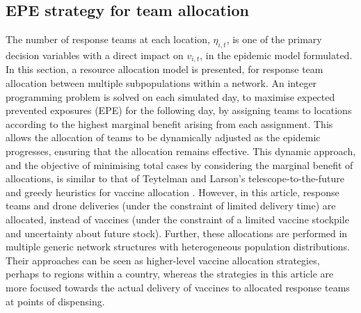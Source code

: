 \documentclass[10pt,letterpaper]{article}
\begin{document}
\subsection*{EPE strategy for team allocation}
The number of response teams at each location, $\eta_{i,t}$, is one of the primary decision variables with a direct impact on $v_{i,t}$, in the epidemic model formulated. In this section, a resource allocation model is presented, for response team allocation between multiple subpopulations within a network. An integer programming problem is solved on each simulated day, to maximise expected prevented exposures (EPE) for the following day, by assigning teams to locations according to the highest marginal benefit arising from each assignment. This allows the allocation of teams to be dynamically adjusted as the epidemic progresses, ensuring that the allocation remains effective. This dynamic approach, and the objective of minimising total cases by considering the marginal benefit of allocations, is similar to that of Teytelman and Larson's telescope-to-the-future and greedy heuristics for vaccine allocation \cite{teytelman2013multiregional}. However, in this article, response teams and drone deliveries (under the constraint of limited delivery time) are allocated, instead of vaccines (under the constraint of a limited vaccine stockpile and uncertainty about future stock). Further, these allocations are performed in multiple generic network structures with heterogeneous population distributions. Their approaches can be seen as higher-level vaccine allocation strategies, perhaps to regions within a country, whereas the strategies in this article are more focused towards the actual delivery of vaccines to allocated response teams at points of dispensing.
\end{document}
